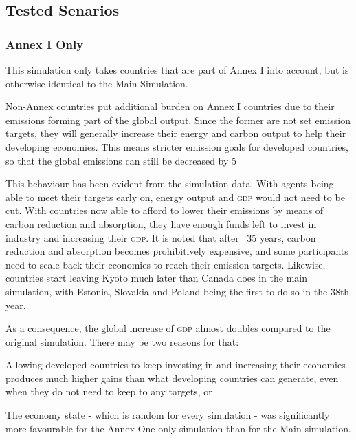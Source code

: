 \subsection{Tested Senarios}

%
%

\subsubsection{Annex I Only}

This simulation only takes countries that are part of Annex I into account, but is otherwise identical to the Main Simulation.

Non-Annex countries put additional burden on Annex I countries due to their emissions forming part of the global output. Since the former are not set emission targets, they will generally increase their energy and carbon output to help their developing economies. This means stricter emission goals for developed countries, so that the global emissions can still be decreased by 5%

This behaviour has been evident from the simulation data. With agents being able to meet their targets early on, energy output and \textsc{gdp} would not need to be cut. With countries now able to afford to lower their emissions by means of carbon reduction and absorption, they have enough funds left to invest in industry and increasing their \textsc{gdp}. It is noted that after ~35 years, carbon reduction and absorption becomes prohibitively expensive, and some participants need to scale back their economies to reach their emission targets. Likewise, countries start leaving Kyoto much later than Canada does in the main simulation, with Estonia, Slovakia and Poland being the first to do so in the 38th year.

As a consequence, the global increase of \textsc{gdp} almost doubles compared to the original simulation. There may be two reasons for that:

Allowing developed countries to keep investing in and increasing their economies produces much higher gains than what developing countries can generate, even when they do not need to keep to any targets, or

The economy state - which is random for every simulation - was significantly more favourable for the Annex One only simulation than for the Main simulation.

